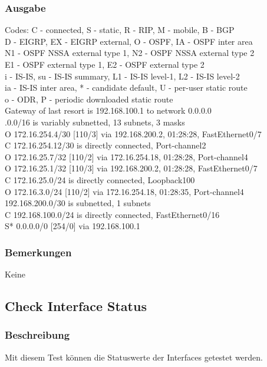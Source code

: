 \documentclass[a4,12pt]{scrartcl}
\begin{document}
\subsubsection{Ausgabe}
Codes: C - connected, S - static, R - RIP, M - mobile, B - BGP\\
       D - EIGRP, EX - EIGRP external, O - OSPF, IA - OSPF inter area\\
       N1 - OSPF NSSA external type 1, N2 - OSPF NSSA external type 2\\
       E1 - OSPF external type 1, E2 - OSPF external type 2\\
       i - IS-IS, su - IS-IS summary, L1 - IS-IS level-1, L2 - IS-IS level-2\\
       ia - IS-IS inter area, * - candidate default, U - per-user static route\\
       o - ODR, P - periodic downloaded static route\\
\noindent Gateway of last resort is 192.168.100.1 to network 0.0.0.0\\
.0.0/16 is variably subnetted, 13 subnets, 3 masks\\
O       172.16.254.4/30 [110/3] via 192.168.200.2, 01:28:28, FastEthernet0/7\\
C       172.16.254.12/30 is directly connected, Port-channel2\\
O       172.16.25.7/32 [110/2] via 172.16.254.18, 01:28:28, Port-channel4\\
O       172.16.25.1/32 [110/3] via 192.168.200.2, 01:28:28, FastEthernet0/7\\
C       172.16.25.0/24 is directly connected, Loopback100\\
O       172.16.3.0/24 [110/2] via 172.16.254.18, 01:28:35, Port-channel4\\
     192.168.200.0/30 is subnetted, 1 subnets\\
C    192.168.100.0/24 is directly connected, FastEthernet0/16\\
S*   0.0.0.0/0 [254/0] via 192.168.100.1
\subsubsection{Bemerkungen}
Keine
\subsection{Check Interface Status}
\subsubsection{Beschreibung}
Mit diesem Test können die Statuswerte der Interfaces getestet werden.
\end{document}
